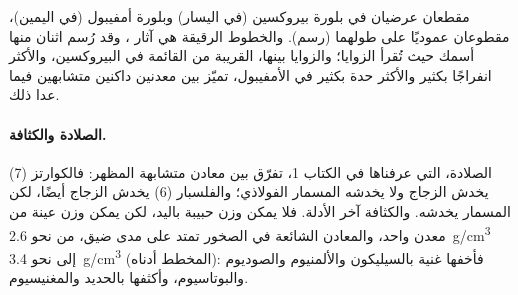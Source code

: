 \begin{omfigure}

{\small مقطعان عرضيان في بلورة بيروكسين (في اليسار) وبلورة أمفيبول
(في اليمين)، مقطوعان عموديًا على طولهما (رسم). والخطوط الرقيقة هي آثار
، وقد رُسم اثنان منها أسمك حيث تُقرأ الزوايا؛
والزوايا بينها، القريبة من القائمة في البيروكسين، والأكثر انفراجًا بكثير والأكثر حدة بكثير في الأمفيبول، تميّز بين
معدنين داكنين متشابهين فيما عدا ذلك.}
\end{omfigure}

\paragraph{الصلادة والكثافة.} الصلادة، التي عرفناها في الكتاب 1، تفرّق بين
معادن متشابهة المظهر: فالكوارتز (7) يخدش الزجاج ولا يخدشه
المسمار الفولاذي؛ والفلسبار (6) يخدش الزجاج أيضًا، لكن المسمار يخدشه.
والكثافة آخر الأدلة. فلا يمكن وزن حبيبة باليد، لكن يمكن وزن
عينة من معدن واحد، والمعادن الشائعة في الصخور تمتد على مدى
ضيق، من نحو \qty{2.6}{g/cm^3} إلى نحو \qty{3.4}{g/cm^3} (المخطط أدناه):
فأخفها غنية بالسيليكون والألمنيوم والصوديوم والبوتاسيوم،
وأكثفها بالحديد والمغنيسيوم.

